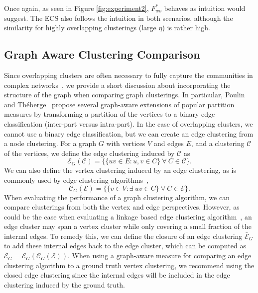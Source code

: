\documentclass[11pt]{article}
\theoremstyle{remark}
\newcommand\cC{\mathcal C}
\newcommand\cE{\mathcal E}
\begin{document}
Once again, as seen in Figure \ref{fig:experiment2}, $F^*_{wo}$ behaves as intuition would suggest.
The ECS also follows the intuition in both scenarios, although the similarity for highly overlapping clusterings (large $\eta$) is rather high.

\subsection{Graph Aware Clustering Comparison}
Since overlapping clusters are often necessary to fully capture the communities in complex networks~\cite{kaminski2021mining}, we provide a short discussion about incorporating the structure of the graph when comparing graph clusterings.
In particular, Poulin and Th\'{e}berge~\cite{gam} propose several graph-aware extensions of popular partition measures by transforming a partition of the vertices to a binary edge classification (inter-part versus intra-part).
In the case of overlapping clusters, we cannot use a binary edge classification, but we can create an edge clustering from a node clustering.
For a graph $G$ with vertices $V$ and edges $E$, and a clustering $\cC$ of the vertices, we define the edge clustering induced by $\cC$ as
\begin{equation*}
    \cE_G(\cC) = \{ \{uv \in E: u,v \in C\} \: \forall \: C \in \cC\}.
\end{equation*}
We can also define the vertex clustering induced by an edge clustering, as is commonly used by edge clustering algorithms~\cite{ahn2010},
\begin{equation*}
    \cC_G(\cE) = \{ \{v \in V: \exists \: uv \in C\} \: \forall \: C \in \cE\}.
\end{equation*}
When evaluating the performance of a graph clustering algorithm, we can compare clusterings from both the vertex and edge perspectives.
However, as could be the case when evaluating a linkage based edge clustering algorithm~\cite{ahn2010,hslc}, an edge cluster may span a vertex cluster while only covering a small fraction of the internal edges.
To remedy this, we can define the closure of an edge clustering $\bar{\cE}_G$ to add these internal edges back to the edge cluster, which can be computed as $\bar{\cE}_G = \cE_G(\cC_G(\cE))$.
When using a graph-aware measure for comparing an edge clustering algorithm to a ground truth vertex clustering, we recommend using the closed edge clustering since the internal edges will be included in the edge clustering induced by the ground truth.
\end{document}
